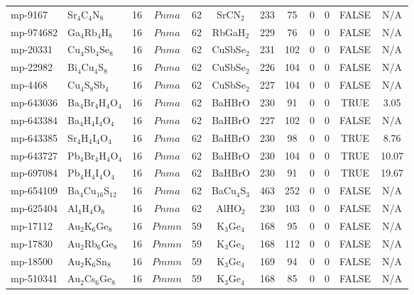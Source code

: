 {\begin{longtable}{llcccccccccc}
    mp-9167 & Sr$_{4}$C$_{4}$N$_{8}$ & 16    & $Pnma$ & 62    & SrCN$_{2}$ & 233   & 75    & 0     & 0     & FALSE & N/A \\
    mp-974682 & Ga$_{4}$Rb$_{4}$H$_{8}$ & 16    & $Pnma$ & 62    & RbGaH$_{2}$ & 229   & 76    & 0     & 0     & FALSE & N/A \\
    mp-20331 & Cu$_{4}$Sb$_{4}$Se$_{8}$ & 16    & $Pnma$ & 62    & CuSbSe$_{2}$ & 231   & 102   & 0     & 0     & FALSE & N/A \\
    mp-22982 & Bi$_{4}$Cu$_{4}$S$_{8}$ & 16    & $Pnma$ & 62    & CuSbSe$_{2}$ & 226   & 104   & 0     & 0     & FALSE & N/A \\
    mp-4468 & Cu$_{4}$S$_{8}$Sb$_{4}$ & 16    & $Pnma$ & 62    & CuSbSe$_{2}$ & 227   & 104   & 0     & 0     & FALSE & N/A \\
    mp-643036 & Ba$_{4}$Br$_{4}$H$_{4}$O$_{4}$ & 16    & $Pnma$ & 62    & BaHBrO & 230   & 91    & 0     & 0     & TRUE  & 3.05  \\
    mp-643384 & Ba$_{4}$H$_{4}$I$_{4}$O$_{4}$ & 16    & $Pnma$ & 62    & BaHBrO & 227   & 102   & 0     & 0     & FALSE & N/A \\
    mp-643385 & Sr$_{4}$H$_{4}$I$_{4}$O$_{4}$ & 16    & $Pnma$ & 62    & BaHBrO & 230   & 98    & 0     & 0     & TRUE  & 8.76  \\
    mp-643727 & Pb$_{4}$Br$_{4}$H$_{4}$O$_{4}$ & 16    & $Pnma$ & 62    & BaHBrO & 230   & 104   & 0     & 0     & TRUE  & 10.07  \\
    mp-697084 & Pb$_{4}$H$_{4}$I$_{4}$O$_{4}$ & 16    & $Pnma$ & 62    & BaHBrO & 230   & 91    & 0     & 0     & TRUE  & 19.67  \\
    mp-654109 & Ba$_{4}$Cu$_{16}$S$_{12}$ & 16    & $Pnma$ & 62    & BaCu$_{4}$S$_{3}$ & 463   & 252   & 0     & 0     & FALSE & N/A \\
    mp-625404 & Al$_{4}$H$_{4}$O$_{8}$ & 16    & $Pnma$ & 62    & AlHO$_{2}$ & 230   & 103   & 0     & 0     & FALSE & N/A \\
    mp-17112 & Au$_{2}$K$_{6}$Ge$_{8}$ & 16    & $Pmmn$ & 59    & K$_{3}$Ge$_{4}$ & 168   & 95    & 0     & 0     & FALSE & N/A \\
    mp-17830 & Au$_{2}$Rb$_{6}$Ge$_{8}$ & 16    & $Pmmn$ & 59    & K$_{3}$Ge$_{4}$ & 168   & 112   & 0     & 0     & FALSE & N/A \\
    mp-18500 & Au$_{2}$K$_{6}$Sn$_{8}$ & 16    & $Pmmn$ & 59    & K$_{3}$Ge$_{4}$ & 169   & 94    & 0     & 0     & FALSE & N/A \\
    mp-510341 & Au$_{2}$Cs$_{6}$Ge$_{8}$ & 16    & $Pmmn$ & 59    & K$_{3}$Ge$_{4}$ & 168   & 85    & 0     & 0     & FALSE & N/A \\

\end{longtable}}
